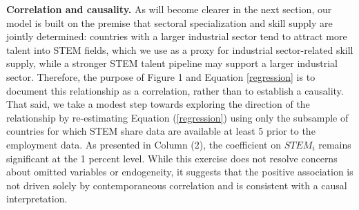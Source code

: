 \documentclass[12pt]{article} %
\theoremstyle{definition}
\begin{document}
\textbf{Correlation and causality.} As will become clearer in the next section, our model is built on the premise that sectoral specialization and skill supply are jointly determined:  countries with a larger industrial sector tend to attract more talent into STEM fields, which we use as a proxy for industrial sector-related skill supply, while a stronger STEM talent pipeline may  support a larger industrial sector. Therefore, the purpose of Figure 1 and Equation \eqref{regression} is to document this relationship as a correlation, rather than to establish a causality. That said, we take a modest step towards exploring the direction of the relationship by   
 re-estimating Equation (\ref{regression}) using only  the subsample of countries for which STEM share data are available at least 5 prior to the employment data. As presented  in Column (2), the coefficient on $STEM_i$ remains significant at the 1 percent level. While this exercise does not resolve concerns about omitted variables or endogeneity, it suggests that the positive association is not  driven solely by contemporaneous correlation and is consistent with a causal interpretation. 


\end{document}

